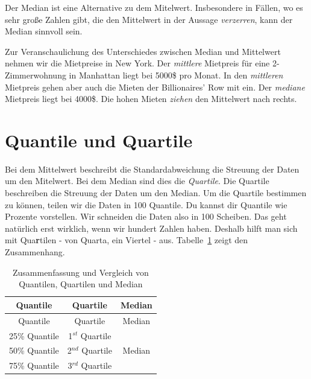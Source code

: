 \documentclass[
  letterpaper,
]{scrbook}
\begin{document}
{}

Der Median ist eine Alternative zu dem Mitelwert. Insbesondere in
Fällen, wo es sehr große Zahlen gibt, die den Mittelwert in der Aussage
\emph{verzerren}, kann der Median sinnvoll sein.

\begin{tcolorbox}[enhanced jigsaw, coltitle=black, titlerule=0mm, bottomrule=.15mm, opacityback=0, opacitybacktitle=0.6, leftrule=.75mm, title=\textcolor{quarto-callout-tip-color}{\faLightbulb}\hspace{0.5em}{Median versus Mittelwert}, toprule=.15mm, bottomtitle=1mm, toptitle=1mm, left=2mm, breakable, arc=.35mm, colback=white, rightrule=.15mm, colbacktitle=quarto-callout-tip-color!10!white, colframe=quarto-callout-tip-color-frame]
Zur Veranschaulichung des Unterschiedes zwischen Median und Mittelwert
nehmen wir die Mietpreise in New York. Der \emph{mittlere} Mietpreis für
eine 2-Zimmerwohnung in Manhattan liegt bei 5000\$ pro Monat. In den
\emph{mittleren} Mietpreis gehen aber auch die Mieten der Billionaires'
Row mit ein. Der \emph{mediane} Mietpreis liegt bei 4000\$. Die hohen
Mieten \emph{ziehen} den Mittelwert nach rechts.
\end{tcolorbox}

\hypertarget{quantile-und-quartile}{%
\section{Quantile und Quartile}\label{quantile-und-quartile}}

Bei dem Mittelwert beschreibt die Standardabweichung die Streuung der
Daten um den Mitelwert. Bei dem Median sind dies die \emph{Quartile}.
Die Quartile beschreiben die Streuung der Daten um den Median. Um die
Quartile bestimmen zu können, teilen wir die Daten in 100 Quantile. Du
kannst dir Quantile wie Prozente vorstellen. Wir schneiden die Daten
also in 100 Scheiben. Das geht natürlich erst wirklich, wenn wir hundert
Zahlen haben. Deshalb hilft man sich mit Qua\textbf{r}tilen - von
Quarta, ein Viertel - aus. Tabelle~\ref{tbl-quart-quant} zeigt den
Zusammenhang.

\hypertarget{tbl-quart-quant}{}
\begin{longtable}[]{@{}ccc@{}}
\caption{\label{tbl-quart-quant}Zusammenfassung und Vergleich von
Quantilen, Quartilen und Median}\tabularnewline
\toprule()
Quantile & Quartile & Median \\
\midrule()
\endfirsthead
\toprule()
Quantile & Quartile & Median \\
\midrule()
\endhead
25\% Quantile & 1\(^{st}\) Quartile & \\
50\% Quantile & 2\(^{nd}\) Quartile & Median \\
75\% Quantile & 3\(^{rd}\) Quartile & \\
\bottomrule()
\end{longtable}
\end{document}
